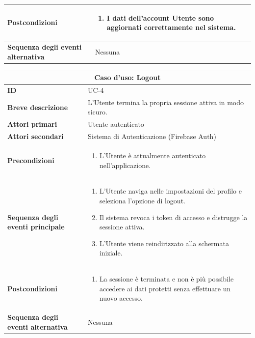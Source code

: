 \documentclass[a4paper]{report}
\begin{document}
\begin{table}[H]
\begin{tabular}{|p{3.9cm}|p{9.9cm}|}
\textbf{Postcondizioni} &
\begin{enumerate}[leftmargin=14pt,label=\arabic*.,labelsep=0.5em,topsep=0pt,partopsep=0pt,parsep=0pt,itemsep=0pt]
\item I dati dell'account Utente sono aggiornati correttamente nel sistema.
\end{enumerate} \\ \hline
\textbf{Sequenza degli eventi alternativa} & Nessuna \\ \hline
\end{tabular}
\end{table}

\newpage

\begin{table}[H]
\vspace*{-0cm}
\renewcommand{\arraystretch}{1.9}
\begin{tabular}{|p{3.9cm}|p{9.9cm}|}
\hline
\multicolumn{2}{|c|}{\textbf{Caso d’uso: Logout}} \\ \hline
\textbf{ID} & UC-4 \\ \hline
\textbf{Breve descrizione} & L'Utente termina la propria sessione attiva in modo sicuro. \\ \hline
\textbf{Attori primari} & Utente autenticato \\ \hline
\textbf{Attori secondari} & Sistema di Autenticazione (Firebase Auth) \\ \hline
\textbf{Precondizioni} & \begin{enumerate}[leftmargin=14pt,label=\arabic*.,labelsep=0.5em,topsep=0pt,partopsep=0pt,parsep=0pt,itemsep=0pt]
    \item L'Utente è attualmente autenticato nell'applicazione.
\end{enumerate} \\ \hline
\textbf{Sequenza degli eventi principale} &
\begin{enumerate}[leftmargin=14pt,label=\arabic*.,labelsep=0.5em,topsep=0pt,partopsep=0pt,parsep=0pt,itemsep=0pt]
   \item L'Utente naviga nelle impostazioni del profilo e seleziona l'opzione di logout.
   \item Il sistema revoca i token di accesso e distrugge la sessione attiva.
   \item L'Utente viene reindirizzato alla schermata iniziale.
\end{enumerate}\\ \hline
\textbf{Postcondizioni} &
\begin{enumerate}[leftmargin=14pt,label=\arabic*.,labelsep=0.5em,topsep=0pt,partopsep=0pt,parsep=0pt,itemsep=0pt]
\item La sessione è terminata e non è più possibile accedere ai dati protetti senza effettuare un nuovo accesso.
\end{enumerate} \\ \hline
\textbf{Sequenza degli eventi alternativa} & Nessuna \\ \hline
\end{tabular}
\end{table}
\end{document}
